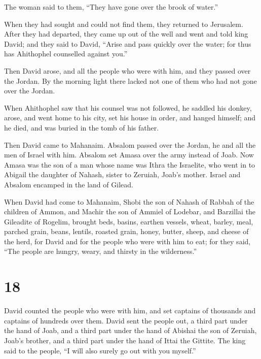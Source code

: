 The woman said to them, ``They have gone over the brook of water.''

When they had sought and could not find them, they returned to
Jerusalem.  After they had departed, they came up out of
the well and went and told king David; and they said to David, ``Arise
and pass quickly over the water; for thus has Ahithophel counselled
against you.''

 Then David arose, and all the people who were with him,
and they passed over the Jordan. By the morning light there lacked not
one of them who had not gone over the Jordan.

 When Ahithophel saw that his counsel was not followed, he
saddled his donkey, arose, and went home to his city, set his house in
order, and hanged himself; and he died, and was buried in the tomb of
his father.

 Then David came to Mahanaim. Absalom passed over the
Jordan, he and all the men of Israel with him.  Absalom set
Amasa over the army instead of Joab. Now Amasa was the son of a man
whose name was Ithra the Israelite, who went in to Abigail the daughter
of Nahash, sister to Zeruiah, Joab's mother.  Israel and
Absalom encamped in the land of Gilead.

 When David had come to Mahanaim, Shobi the son of Nahash
of Rabbah of the children of Ammon, and Machir the son of Ammiel of
Lodebar, and Barzillai the Gileadite of Rogelim,  brought
beds, basins, earthen vessels, wheat, barley, meal, parched grain,
beans, lentils, roasted grain,  honey, butter, sheep, and
cheese of the herd, for David and for the people who were with him to
eat; for they said, ``The people are hungry, weary, and thirsty in the
wilderness.''

\hypertarget{section-17}{%
\section{18}\label{section-17}}

 David counted the people who were with him, and set
captains of thousands and captains of hundreds over them. 
David sent the people out, a third part under the hand of Joab, and a
third part under the hand of Abishai the son of Zeruiah, Joab's brother,
and a third part under the hand of Ittai the Gittite. The king said to
the people, ``I will also surely go out with you myself.''

